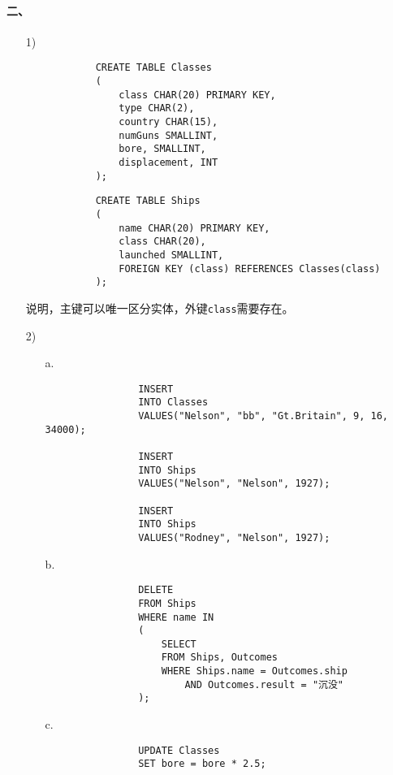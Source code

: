 \documentclass[10pt,a4paper]{article}
\begin{document}
    \paragraph{二、}
    \begin{enumerate}
        \item[1)]\begin{verbatim}
            CREATE TABLE Classes
            (
                class CHAR(20) PRIMARY KEY,
                type CHAR(2),
                country CHAR(15),
                numGuns SMALLINT,
                bore, SMALLINT,
                displacement, INT
            );
        \end{verbatim}
        
        \begin{verbatim}
            CREATE TABLE Ships
            (
                name CHAR(20) PRIMARY KEY,
                class CHAR(20),
                launched SMALLINT,
                FOREIGN KEY (class) REFERENCES Classes(class)
            );
        \end{verbatim}

        说明，主键可以唯一区分实体，外键\texttt{class}需要存在。
        \item[2)]\begin{itemize}
            \item[a.]\begin{verbatim}
                INSERT 
                INTO Classes
                VALUES("Nelson", "bb", "Gt.Britain", 9, 16, 34000);

                INSERT
                INTO Ships
                VALUES("Nelson", "Nelson", 1927);

                INSERT
                INTO Ships
                VALUES("Rodney", "Nelson", 1927);
            \end{verbatim}
            \item[b.]\begin{verbatim}
                DELETE
                FROM Ships
                WHERE name IN
                (
                    SELECT
                    FROM Ships, Outcomes
                    WHERE Ships.name = Outcomes.ship
                        AND Outcomes.result = "沉没"
                );
            \end{verbatim}
            \item[c.]\begin{verbatim}
                UPDATE Classes
                SET bore = bore * 2.5;


\end{verbatim}
\end{itemize}
\end{enumerate}
\end{document}
